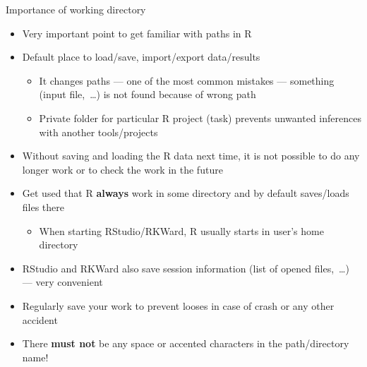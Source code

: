 \documentclass[compress, ucs, xelatex, 11pt, xcolor=svgnames, aspectratio=169,
	hyperref={
		bookmarks=true,
		unicode=true,
		colorlinks=true,
		pdftitle={Molecular data in R},
		plainpages=false,
		pdfauthor={Vojtech Zeisek},
		pdfsubject={Course about phylogeny and evolution in R},
		pdfcreator={XeLaTeX},
		pdfkeywords={R, evolution, phylogeny, molecular data},
		linkcolor=Crimson, %
		anchorcolor=Magenta, %
		citecolor=Magenta, %
		filecolor=Magenta, %
		menucolor=Magenta, %
		urlcolor=DodgerBlue, %
		pdftex},
	url={hyphens, lowtilde} %
	]{beamer}
\begin{document}
\begin{frame}{Importance of working directory}
	\begin{itemize}
	 \item Very important point to get familiar with paths in R
		\item Default place to load/save, import/export data/results
		\begin{itemize}
			\item It changes paths --- one of the most common mistakes --- something (input file,~\ldots) is not found because of wrong path
			\item Private folder for particular R project (task) prevents unwanted inferences with another tools/projects
		\end{itemize}
		\item Without saving and loading the R data next time, it is not possible to do any longer work or to check the work in the future
		\item \alert{Get used that R \textbf{always} work in some directory and by default saves/loads files there}
		\begin{itemize}
		 \item When starting RStudio/RKWard, R usually starts in user's home directory
		\end{itemize}
		\item RStudio and RKWard also save session information (list of opened files,~\ldots) --- very convenient
		\item Regularly save your work to prevent looses in case of crash or any other accident
		\item \alert{There \textbf{must not} be any space or accented characters in the path/directory name!}
	\end{itemize}
\end{frame}
\end{document}
